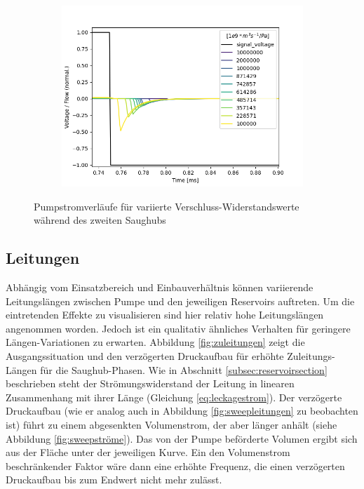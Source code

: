\documentclass[fontsize=12pt, a4paper]{scrartcl}
\begin{document}
\begin{figure}[H]
	\centering
	\begin{subfigure}[H]{0.48\textwidth}
		\includegraphics[width=\textwidth, valign=t]{bilder/leakage/leakage_in_branch_multiweep_flow.png}
	\end{subfigure}
    \caption{Pumpstromverläufe für variierte Verschluss-Widerstandswerte während des zweiten Saughubs}
    \label{fig:leckagestrom}
\end{figure}

\subsection{Leitungen}

Abhängig vom Einsatzbereich und Einbauverhältnis können variierende Leitungslängen zwischen Pumpe und den jeweiligen Reservoirs auftreten. Um die eintretenden Effekte zu visualisieren sind hier relativ hohe Leitungslängen angenommen worden. Jedoch ist ein qualitativ ähnliches Verhalten für geringere Längen-Variationen zu erwarten. Abbildung \ref{fig:zuleitungen} zeigt die Ausgangssituation und den verzögerten Druckaufbau für erhöhte Zuleitungs-Längen für die Saughub-Phasen. Wie in Abschnitt \ref{subsec:reservoirsection} beschrieben steht der Strömungswiderstand der Leitung in linearen Zusammenhang mit ihrer Länge (Gleichung \ref{eq:leckagestrom}). Der verzögerte Druckaufbau (wie er analog auch in Abbildung \ref{fig:sweepleitungen} zu beobachten ist) führt zu einem abgesenkten Volumenstrom, der aber länger anhält (siehe Abbildung \ref{fig:sweepströme}). Das von der Pumpe beförderte Volumen ergibt sich aus der Fläche unter der jeweiligen Kurve. Ein den Volumenstrom beschränkender Faktor wäre dann eine erhöhte Frequenz, die einen verzögerten Druckaufbau bis zum Endwert nicht mehr zulässt.
\end{document}
